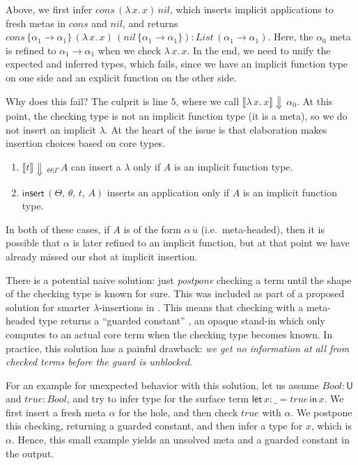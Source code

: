 \documentclass[acmsmall,review,anonymous,prologue,dvipsnames]{acmart}\settopmatter{printfolios=true,printccs=false,printacmref=false}
\newcommand{\slet}{\boldsymbol{\mathsf{let}}}
\renewcommand{\sin}{\boldsymbol{\mathsf{in}}}
\renewcommand{\U}{\mathsf{U}}
\newcommand{\echeck}[4]{\llbracket#1\rrbracket\!\Downarrow\,_{#2|#3}\,#4}
\newcommand{\echeckt}[2]{\llbracket#1\rrbracket\!\Downarrow\,#2}
\newcommand{\einsert}{\mathsf{insert}}
\theoremstyle{remark}
\begin{document}
Above, we first infer $cons\,(\lambda\,x.\,x)\,nil$, which inserts implicit
applications to fresh metas in $cons$ and $nil$, and returns $cons\,\{\alpha_1
\to \alpha_1\}\,(\lambda\,x.\,x)\,(nil\,\{\alpha_1\to\alpha_1\}) :
List\,(\alpha_1\to\alpha_1)$. Here, the $\alpha_0$ meta is refined to $\alpha_1
\to \alpha_1$ when we check $\lambda\,x.\,x$. In the end, we need to unify the
expected and inferred types, which fails, since we have an implicit function
type on one side and an explicit function on the other side.

Why does this fail? The culprit is line $\scriptstyle{5}$, where we call
$\echeckt{\lambda\,x.\,x}{\alpha_0}$. At this point, the checking type is not an
implicit function type (it is a meta), so we do not insert an implicit
$\lambda$. At the heart of the issue is that elaboration makes insertion choices
based on core types.
\begin{enumerate}
\item $\echeck{t}{\Theta}{\Gamma}{A}$ can insert a $\lambda$ only if $A$ is an implicit function type.
\item $\einsert\,(\Theta,\,\theta,\,t,\,A)$ inserts an application only if $A$ is an implicit function type.
\end{enumerate}
In both of these cases, if $A$ is of the form $\alpha\,\overline{u}$
(i.e.\ meta-headed), then it is possible that $\alpha$ is later refined to an
implicit function, but at that point we have already missed our shot at implicit
insertion.

There is a potential naive solution: just \emph{postpone} checking a term until
the shape of the checking type is known for sure. This was included as part of a
proposed solution for smarter $\lambda$-insertions in
\cite{johansson2015eliminating}. This means that checking with a meta-headed
type returns a ``guarded constant'' \cite[Chapter~3]{norell07thesis}, an opaque
stand-in which only computes to an actual core term when the checking type
becomes known. In practice, this solution has a painful drawback: \emph{we get
  no information at all from checked terms before the guard is unblocked}.

For an example for unexpected behavior with this solution, let us assume $Bool :
\U$ and $true : Bool$, and try to infer type for the surface term $\slet\,x : \_
= true\,\sin\, x$. We first insert a fresh meta $\alpha$ for the hole, and then
check $true$ with $\alpha$. We postpone this checking, returning a guarded
constant, and then infer a type for $x$, which is $\alpha$. Hence, this small
example yields an unsolved meta and a guarded constant in the output.
\end{document}
